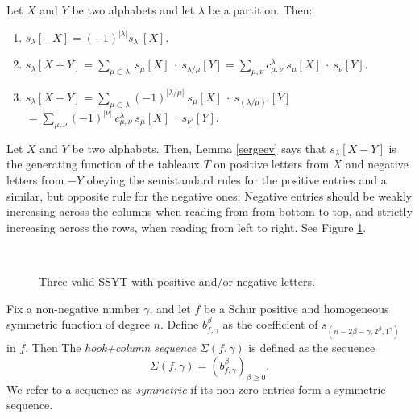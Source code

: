 \documentclass[twoside]{article}
\begin{document}
\begin{lem}\label{sergeev} Let $X$ and $Y$ be two alphabets and let $\lambda$ be a partition. Then:
\begin{enumerate}
    \item $s_\lambda[-X] = (-1)^{|\lambda|}s_{\lambda'}[X].$
    \item $s_\lambda[X+Y] = \sum_{\mu\subset\lambda} \ s_\mu[X] \ \cdot \ s_{\lambda/\mu}[Y] = \sum_{\mu,\nu}c_{\mu,\nu}^\lambda \ s_\mu[X]\ \cdot \ s_{\nu}[Y].$
    \item
    \( s_\lambda[X-Y] = \sum_{\mu\subset\lambda}(-1)^{|\lambda/\mu|}\ s_\mu[X]\ \cdot \ s_{(\lambda/\mu)'}[Y]
    \)
    \\ \phantom{$s_\lambda[X-Y]$} 
    \(
    = \sum_{\mu,\nu}(-1)^{|\nu|}\ c_{\mu,\nu}^\lambda \ s_\mu[X]\ \cdot \ s_{\nu'}[Y].
    \)
\end{enumerate}
\end{lem}
\begin{Note}\label{note:positive and negative} Let $X$ and $Y$ be two alphabets. Then, Lemma \ref{sergeev} says that $s_\lambda[X-Y]$ is the generating function of the tableaux $T$ on positive letters from $X$ and negative letters from $-Y$ obeying the semistandard rules for the positive entries and a similar, but opposite rule for the negative ones: Negative entries should be weakly increasing across the columns when reading from from bottom to top, and strictly increasing across the rows, when reading from left to right. See Figure \ref{fig:negative}.
\end{Note}
\begin{figure}[h]
    \centering
    \ytableaubig
    \footnotesize
    $\quad\quad$
    $\quad\quad$
    \caption{Three valid SSYT with positive and/or negative letters.}
    \label{fig:negative}
\end{figure}





\begin{de}\label{def_flip} 
Fix a non-negative number $\gamma$, and
let $f$ be a Schur positive and homogeneous symmetric function of
degree $n$.  Define $b_{f,\gamma}^\beta$ as the coefficient  of $s_{(n-2\beta-\gamma, 2^\beta, 1^\gamma)}$ in $f$. Then 
The \emph{hook+column sequence}  $\Sigma(f, \gamma)$ is defined as the sequence
\[
\Sigma(f, \gamma) = (b_{f,\gamma}^\beta)_{\beta \ge 0}.
\]
We refer to a sequence as \emph{symmetric} if its non-zero entries form a symmetric sequence.
\end{de}
\end{document}
